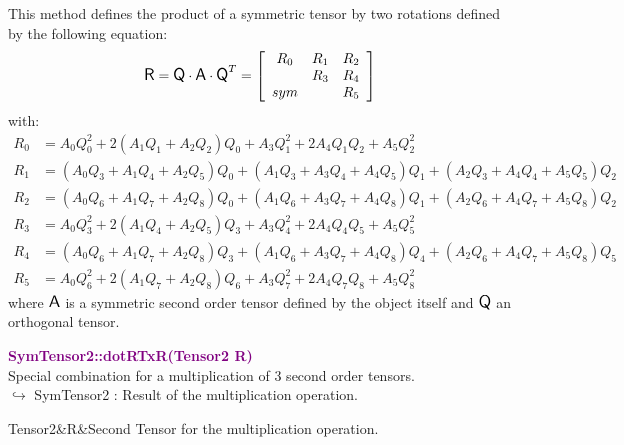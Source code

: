 This method defines the product of a symmetric tensor by two rotations defined by the following equation:
\begin{equation*}
\mbox{\large\ensuremath{\mathsf{R}}} = \mbox{\large\ensuremath{\mathsf{Q}}} \cdot \mbox{\large\ensuremath{\mathsf{A}}} \cdot \mbox{\large\ensuremath{\mathsf{Q}}}^T =\left[\begin{array}{ccc}
R_0 & R_1 & R_2\\
& R_3 & R_4\\
sym &  & R_5
\end{array}\right]
\end{equation*}
with:
\begin{align*}
R_0 & = A_0 Q_0^2 + 2 (A_1 Q_1 + A_2 Q_2)Q_0 + A_3 Q_1^2 + 2 A_4 Q_1 Q_2 + A_5 Q_2^2\\
R_1 & = (A_0 Q_3 + A_1 Q_4 + A_2 Q_5)Q_0 + (A_1 Q_3 + A_3 Q_4 + A_4 Q_5)Q_1 + (A_2 Q_3 + A_4 Q_4 + A_5 Q_5)Q_2\\
R_2 & = (A_0 Q_6 + A_1 Q_7 + A_2 Q_8)Q_0 + (A_1 Q_6 + A_3 Q_7 + A_4 Q_8)Q_1 + (A_2 Q_6 + A_4 Q_7 + A_5 Q_8)Q_2\\
R_3 & = A_0 Q_3^2 + 2 (A_1 Q_4 + A_2 Q_5)Q_3+ A_3 Q_4^2 + 2 A_4 Q_4 Q_5 + A_5 Q_5^2\\
R_4 & = (A_0 Q_6 + A_1 Q_7 + A_2 Q_8)Q_3 + (A_1 Q_6 + A_3 Q_7 + A_4 Q_8)Q_4 + (A_2 Q_6 + A_4 Q_7 + A_5 Q_8)Q_5\\
R_5 & = A_0 Q_6^2 + 2 (A_1 Q_7 + A_2 Q_8)Q_6+ A_3 Q_7^2 + 2 A_4 Q_7 Q_8 + A_5 Q_8^2
\end{align*}
where $\mbox{\large\ensuremath{\mathsf{A}}}$ is a symmetric second order tensor defined by the object itself and $\mbox{\large\ensuremath{\mathsf{Q}}}$ an orthogonal tensor.

\textcolor{purple}{\textbf{SymTensor2::dotRTxR(Tensor2 R)}}\label{SymTensor2::dotRTxR(Tensor2 R)}\\
Special combination for a multiplication of 3 second order tensors.\\ \hspace*{10mm}$\hookrightarrow$ SymTensor2 : Result of the multiplication operation.

\begin{tcolorbox}[width=\textwidth,myArgs,tabularx={ll|R}]
Tensor2&R&Second Tensor for the multiplication operation.
\end{tcolorbox}

